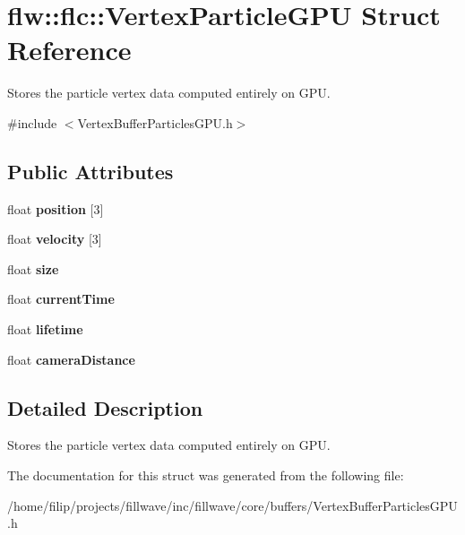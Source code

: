 \hypertarget{structflw_1_1flc_1_1VertexParticleGPU}{}\section{flw\+:\+:flc\+:\+:Vertex\+Particle\+G\+PU Struct Reference}
\label{structflw_1_1flc_1_1VertexParticleGPU}


Stores the particle vertex data computed entirely on G\+PU.  




{\ttfamily \#include $<$Vertex\+Buffer\+Particles\+G\+P\+U.\+h$>$}

\subsection*{Public Attributes}
\begin{DoxyCompactItemize}
\item 
\mbox{\label{structflw_1_1flc_1_1VertexParticleGPU_a804ab5c4585472cc98ddbc26c9aad042}} 
float {\bfseries position} \mbox{[}3\mbox{]}
\item 
\mbox{\label{structflw_1_1flc_1_1VertexParticleGPU_a543447048acf2b7a31902a1e3e908b44}} 
float {\bfseries velocity} \mbox{[}3\mbox{]}
\item 
\mbox{\label{structflw_1_1flc_1_1VertexParticleGPU_ae08d00fc512c926bc16be75a3e65ae71}} 
float {\bfseries size}
\item 
\mbox{\label{structflw_1_1flc_1_1VertexParticleGPU_ad3a44fd470c89ab69d15a16952425dc5}} 
float {\bfseries current\+Time}
\item 
\mbox{\label{structflw_1_1flc_1_1VertexParticleGPU_a866ff7b16d6d8de7b305a5957063880f}} 
float {\bfseries lifetime}
\item 
\mbox{\label{structflw_1_1flc_1_1VertexParticleGPU_a3a52cb5fc0a298ee40fe496164d19e57}} 
float {\bfseries camera\+Distance}
\end{DoxyCompactItemize}


\subsection{Detailed Description}
Stores the particle vertex data computed entirely on G\+PU. 

The documentation for this struct was generated from the following file\+:\begin{DoxyCompactItemize}
\item 
/home/filip/projects/fillwave/inc/fillwave/core/buffers/Vertex\+Buffer\+Particles\+G\+P\+U.\+h\end{DoxyCompactItemize}

